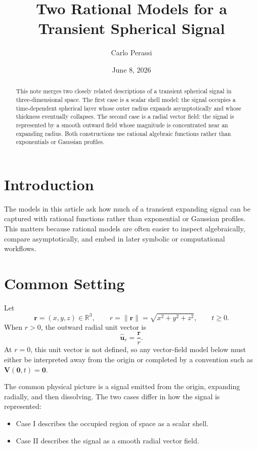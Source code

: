 \documentclass[a4paper,12pt]{article}
\title{\textbf{Two Rational Models for a Transient Spherical Signal}}
\author{Carlo Perassi}
\date{June 8, 2026}
\begin{document}
\maketitle

\begin{abstract}
This note merges two closely related descriptions of a transient spherical
signal in three-dimensional space. The first case is a scalar shell model: the
signal occupies a time-dependent spherical layer whose outer radius expands
asymptotically and whose thickness eventually collapses. The second case is a
radial vector field: the signal is represented by a smooth outward field whose
magnitude is concentrated near an expanding radius. Both constructions use
rational algebraic functions rather than exponentials or Gaussian profiles.
\end{abstract}

\section{Introduction}

The models in this article ask how much of a transient expanding signal can be
captured with rational functions rather than exponential or Gaussian profiles.
This matters because rational models are often easier to inspect algebraically,
compare asymptotically, and embed in later symbolic or computational workflows.

\section{Common Setting}

Let
\[
    \bm{r}=(x,y,z)\in\mathbb{R}^3,
    \qquad
    r=\|\bm{r}\|=\sqrt{x^2+y^2+z^2},
    \qquad
    t\ge 0.
\]
When \(r>0\), the outward radial unit vector is
\[
    \hat{\bm{u}}_r=\frac{\bm{r}}{r}.
\]
At \(r=0\), this unit vector is not defined, so any vector-field model below
must either be interpreted away from the origin or completed by a convention
such as \(\bm{V}(\bm{0},t)=\bm{0}\).

The common physical picture is a signal emitted from the origin, expanding
radially, and then dissolving. The two cases differ in how the signal is
represented:
\begin{itemize}
    \item Case I describes the occupied region of space as a scalar shell.
    \item Case II describes the signal as a smooth radial vector field.
\end{itemize}
\end{document}

